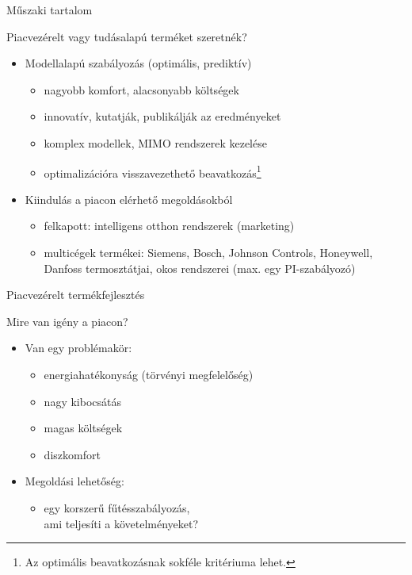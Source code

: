 \documentclass[14pt,handout]{beamer}
\begin{document}
\begin{frame}{Műszaki tartalom}

Piacvezérelt vagy tudásalapú terméket szeretnék?

\begin{itemize}
	\setlength{\itemsep}{7pt}
	\item Modellalapú szabályozás (optimális, prediktív)
	\begin{itemize}
		\item nagyobb komfort, alacsonyabb költségek
		\item innovatív, kutatják, publikálják az eredményeket
		\item komplex modellek, MIMO rendszerek kezelése
		\item optimalizációra visszavezethető beavatkozás\footnote{Az optimális beavatkozásnak sokféle kritériuma lehet.}
	\end{itemize}
	\item Kiindulás a piacon elérhető megoldásokból
	\begin{itemize}
		\item felkapott: intelligens otthon rendszerek (marketing)
		\item multicégek termékei: Siemens, Bosch, Johnson Controls, Honeywell, Danfoss termosztátjai, okos rendszerei (max. egy PI-szabályozó)
	\end{itemize}
\end{itemize}
\end{frame}

\begin{frame}{Piacvezérelt termékfejlesztés}

Mire van igény a piacon?

\begin{itemize}
	\setlength{\itemsep}{7pt}
	\item Van egy problémakör:
	\begin{itemize}
		\item energiahatékonyság (törvényi megfelelőség)
		\item nagy kibocsátás
		\item magas költségek
		\item diszkomfort
	\end{itemize}
	\pause
	
	\item Megoldási lehetőség:
	\begin{itemize}
		\item egy korszerű fűtésszabályozás,\\
		ami teljesíti a követelményeket?
	\end{itemize}
\end{itemize}
\end{frame}
\end{document}
